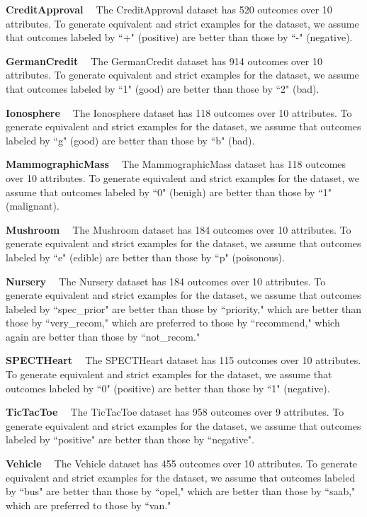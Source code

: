 \smallskip \noindent \textbf{CreditApproval \ }
The CreditApproval dataset has 520 outcomes over 10 attributes.
To generate equivalent and strict examples for the dataset,
we assume that outcomes labeled by ``+" (positive) are better than
those by ``-" (negative).

\smallskip \noindent \textbf{GermanCredit \ }
The GermanCredit dataset has 914 outcomes over 10 attributes.
To generate equivalent and strict examples for the dataset,
we assume that outcomes labeled by ``1" (good) are better than
those by ``2" (bad).

\smallskip \noindent \textbf{Ionosphere \ }
The Ionosphere dataset has 118 outcomes over 10 attributes.
To generate equivalent and strict examples for the dataset,
we assume that outcomes labeled by ``g" (good) are better than
those by ``b" (bad).

\smallskip \noindent \textbf{MammographicMass \ }
The MammographicMass dataset has 118 outcomes over 10 attributes.
To generate equivalent and strict examples for the dataset,
we assume that outcomes labeled by ``0" (benigh) are better than
those by ``1" (malignant).

\smallskip \noindent \textbf{Mushroom \ }
The Mushroom dataset has 184 outcomes over 10 attributes.
To generate equivalent and strict examples for the dataset,
we assume that outcomes labeled by ``e" (edible) are better than
those by ``p" (poisonous).

\smallskip \noindent \textbf{Nursery \ }
The Nursery dataset has 184 outcomes over 10 attributes.
To generate equivalent and strict examples for the dataset,
we assume that outcomes labeled by ``spec\_prior" are better than
those by ``priority," which are better than those
by ``very\_recom," which are preferred to those by ``recommend,"
which again are better than those by ``not\_recom."

\smallskip \noindent \textbf{SPECTHeart \ }
The SPECTHeart dataset has 115 outcomes over 10 attributes.
To generate equivalent and strict examples for the dataset,
we assume that outcomes labeled by ``0" (positive) are better than
those by ``1" (negative).

\smallskip \noindent \textbf{TicTacToe \ }
The TicTacToe dataset has 958 outcomes over 9 attributes.
To generate equivalent and strict examples for the dataset,
we assume that outcomes labeled by ``positive" are better than
those by ``negative".

\smallskip \noindent \textbf{Vehicle \ }
The Vehicle dataset has 455 outcomes over 10 attributes.
To generate equivalent and strict examples for the dataset,
we assume that outcomes labeled by ``bus" are better than
those by ``opel," which are better than those
by ``saab," which are preferred to those by ``van."

